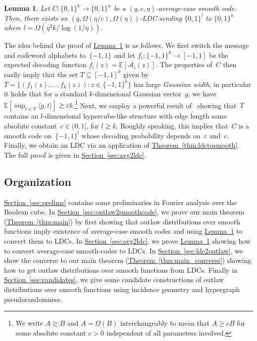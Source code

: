 \documentclass[11pt]{article}
\numberwithin{equation}{section}
\newtheorem{lemma}[theorem]{Lemma}
\theoremstyle{definition}
\theoremstyle{plain}
\newcommand{\expref}[2]{\hyperref[#2]{#1~\ref{#2}}}
\newcommand{\bset}[1]{\{0,1\}^{#1}} %
\newcommand{\pmset}[1]{\{-1,1\}^{#1}} %
\newcommand{\sBC}{{\{-1,1\}}}
\newcommand{\Exp}{{\mathbb{E}}}
\newcommand{\E}{\mathbb{E}}
\newcommand{\eps}{\varepsilon}
\newcommand{\cA}{{\mathcal A}}
\begin{document}
\begin{lemma}\label{lem:ave2ldc}
Let $C:\bset{k}\to \bset{n}$ be a $(q,c,\eta)$-average-case smooth code. 
Then, there exists an $(q,\Omega(\eta/c), \Omega(\eta))$-LDC sending $\bset{l}$ to $\bset{n}$ where $l=\Omega(\eta^2 k/\log(1/\eta))$.
\end{lemma}

The idea behind the proof of \expref{Lemma}{lem:ave2ldc} is as follows.
We first switch the message and codeword alphabets to~$\pmset{}$ and let $f_i:\pmset{k}\to [-1,1]$ be the expected decoding function $f_i(z)=\E[\cA_i(z)]$.
The properties of~$C$ then easily imply that the set $T\subseteq [-1,1]^k$ given by $T=\{(f_1(z),\dots,f_k(z)):z\in \sBC^k\}$ has large \emph{Gaussian width}, in particular it holds that for a standard $k$-dimensional Gaussian vector~$g$, we have $\Exp[\sup_{t\in T}\langle g, t\rangle]  \gtrsim \eps k$.\footnote{We write $A\gtrsim B$ and $A=\Omega(B)$ interchangeably to mean that $A\ge c B$ for some absolute constant $c>0$ independent of all parameters involved.}
Next, we employ a powerful result of~\cite{Mendelson:2003} showing that~$T$ contains an $l$-dimensional hypercube-like structure with edge length some absolute constant~$c\in (0,1]$, for $l \gtrsim k$.
Roughly speaking, this implies that~$C$ is a smooth code on~$\pmset{l}$ whose decoding probability depends on~$\eps$ and~$c$.
Finally, we obtain an LDC via an application of \expref{Theorem}{thm:ldctosmooth}.
The full proof is given in \expref{Section}{sec:avg2ldc}.


\subsection{Organization}
\expref{Section}{sec:prelims} contains some preliminaries in Fourier analysis over the Boolean cube. In \expref{Section}{sec:outlaw2smoothcode}, we prove our main theorem (\expref{Theorem}{thm:main}) by first showing that outlaw distributions over smooth functions imply existence of average-case smooth codes and using \expref{Lemma}{lem:ave2ldc} to convert them to LDCs. In \expref{Section}{sec:avg2ldc}, we prove \expref{Lemma}{lem:ave2ldc} showing how to convert average-case smooth-codes to LDCs. In \expref{Section}{sec:ldc2outlaw}, we show the converse to our main theorem (\expref{Theorem}{thm:main_converse}) showing how to get outlaw distributions over smooth functions from LDCs. Finally in \expref{Section}{sec:candidates}, we give some candidate constructions of outlaw distributions over smooth functions using incidence geometry and hypergraph pseudorandomness.
\end{document}
